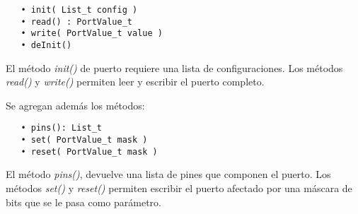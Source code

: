 \begin{verbatim}
   • init( List_t config )
   • read() : PortValue_t
   • write( PortValue_t value )
   • deInit()
\end{verbatim}

El método \emph{init()} de puerto requiere una lista de configuraciones. Los métodos \emph{read()} y \emph{write()} permiten leer y escribir el puerto completo.

Se agregan además los métodos:

\begin{verbatim}
   • pins(): List_t
   • set( PortValue_t mask )
   • reset( PortValue_t mask )
\end{verbatim}

El método \emph{pins()}, devuelve una lista de pines que componen el puerto. Los métodos \emph{set()} y \emph{reset()} permiten escribir el puerto afectado por una máscara de bits que se le pasa como parámetro.






